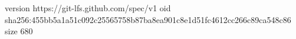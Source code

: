 version https://git-lfs.github.com/spec/v1
oid sha256:455bb5a1a51c092c25565758b87ba8ea901c8e1d51fc4612cc266c89ca548c86
size 680

